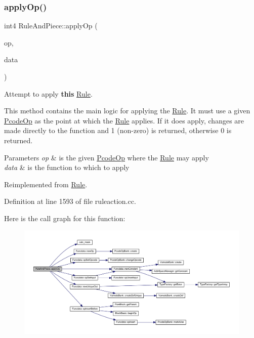 \subsubsection{\texorpdfstring{applyOp()}{applyOp()}}
{\footnotesize\ttfamily int4 Rule\+And\+Piece\+::apply\+Op (\begin{DoxyParamCaption}\item[{\mbox{\hyperlink{class_pcode_op}{Pcode\+Op}} $\ast$}]{op,  }\item[{\mbox{\hyperlink{class_funcdata}{Funcdata}} \&}]{data }\end{DoxyParamCaption})\hspace{0.3cm}{\ttfamily [virtual]}}



Attempt to apply {\bfseries{this}} \mbox{\hyperlink{class_rule}{Rule}}. 

This method contains the main logic for applying the \mbox{\hyperlink{class_rule}{Rule}}. It must use a given \mbox{\hyperlink{class_pcode_op}{Pcode\+Op}} as the point at which the \mbox{\hyperlink{class_rule}{Rule}} applies. If it does apply, changes are made directly to the function and 1 (non-\/zero) is returned, otherwise 0 is returned. 
\begin{DoxyParams}{Parameters}
{\em op} & is the given \mbox{\hyperlink{class_pcode_op}{Pcode\+Op}} where the \mbox{\hyperlink{class_rule}{Rule}} may apply \\
\hline
{\em data} & is the function to which to apply \\
\hline
\end{DoxyParams}


Reimplemented from \mbox{\hyperlink{class_rule_a4e3e61f066670175009f60fb9dc60848}{Rule}}.



Definition at line 1593 of file ruleaction.\+cc.

Here is the call graph for this function\+:
\nopagebreak
\begin{figure}[H]
\begin{center}
\leavevmode
\includegraphics[width=350pt]{class_rule_and_piece_a21d9a8514b5713b5899f9f84f93b0156_cgraph}
\end{center}
\end{figure}
\mbox{\label{class_rule_and_piece_a7cdade8a979293fcc0cfd74888e93b12}} 
